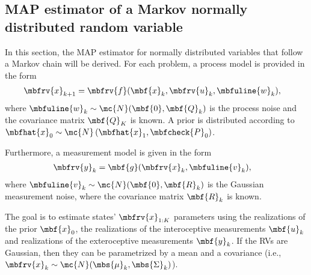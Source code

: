 \subsection{MAP estimator of a Markov normally distributed random variable}

In this section, the MAP estimator for normally distributed variables that follow a Markov chain will be derived. For each problem, a process model is provided in the form 
\begin{align}
    \label{eq:MAP state estimation process model}
    \mbfrv{x}_{k+1} &= \mbfrv{f}(\mbf{x}_{k}, \mbfrv{u}_{k}, \mbfuline{w}_{k}),
\end{align}
where $\mbfuline{w}_{k}\sim\mc{N}(\mbf{0},\mbf{Q}_{k})$ is the process noise and the covariance matrix $\mbf{Q}_{K}$ is known. A prior is distributed according to $\mbfhat{x}_{0}\sim\mc{N}\left( \mbfhat{x}_{1}, \mbfcheck{P}_{0} \right)$.

Furthermore, a measurement model is given in the form
\begin{align}
    \label{eq:MAP state estimation measurement model}
    \mbfrv{y}_{k} &= \mbf{g}(\mbfrv{x}_{k}, \mbfuline{v}_{k}),
\end{align}
where $\mbfuline{v}_{k}\sim\mc{N}(\mbf{0},\mbf{R}_{k})$ is the Gaussian measurement noise, where the covariance matrix $\mbf{R}_{k}$ is known. 

The goal is to estimate states' $\mbfrv{x}_{1:K}$ parameters using the realizations of the prior $\mbf{x}_{0}$, the realizations of the interoceptive measurements $\mbf{u}_{k}$ and realizations of the exteroceptive measurements $\mbf{y}_{k}$. If the RVs are Gaussian, then they can be parametrized by a mean and a covariance (i.e., $\mbfrv{x}_{k}\sim\mc{N}(\mbs{\mu}_{k}, \mbs{\Sigma}_{k})$). 

